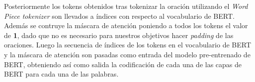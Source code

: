 %
%		
%		
%	

Posteriormente los tokens obtenidos tras tokenizar la oraci\'on utilizando el \emph{Word Piece tokenizer} son llevados a \'indices con respecto al vocabulario de BERT. Adem\'as se contruye la m\'ascara de atenci\'on poniendo a todos los tokens el valor de \textbf{1}, dado que no es necesario para nuestros objetivos hacer \emph{padding} de las oraciones. Luego la secuencia de \'indices de los tokens en el vocabulario de BERT y la m\'ascara de atenci\'on son pasadas como entrada del modelo pre-entrenado de BERT, obteniendo as\'i como salida la codificaci\'on de cada una de las capas de BERT para cada una de las palabras.

